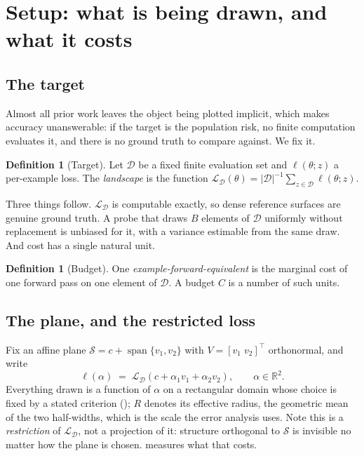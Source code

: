 \documentclass[11pt]{article}
\theoremstyle{definition}
\newtheorem{definition}[theorem]{Definition}
\newcommand{\R}{\mathbb{R}}
\newcommand{\Loss}{\mathcal{L}}
\newcommand{\D}{\mathcal{D}}
\newcommand{\Plane}{\mathcal{S}}
\begin{document}
\section{Setup: what is being drawn, and what it costs}
\label{sec:setup}

\subsection{The target}

Almost all prior work leaves the object being plotted implicit, which makes accuracy
unanswerable: if the target is the population risk, no finite computation evaluates it,
and there is no ground truth to compare against. We fix it.

\begin{definition}[Target]
Let $\D$ be a fixed finite evaluation set and $\ell(\theta;z)$ a per-example loss. The
\emph{landscape} is the function
$\Loss_\D(\theta)=|\D|^{-1}\sum_{z\in\D}\ell(\theta;z)$.
\end{definition}

Three things follow. $\Loss_\D$ is computable exactly, so dense reference surfaces are
genuine ground truth. A probe that draws $B$ elements of $\D$ uniformly without
replacement is unbiased for it, with a variance estimable from the same draw. And cost
has a single natural unit.

\begin{definition}[Budget]
One \emph{example-forward-equivalent} is the marginal cost of one forward pass on one
element of $\D$. A budget $C$ is a number of such units.
\end{definition}

\subsection{The plane, and the restricted loss}

Fix an affine plane $\Plane=c+\operatorname{span}\{v_1,v_2\}$ with $V=[v_1\;v_2]^\top$
orthonormal, and write
\[
  \ell(\alpha)\;=\;\Loss_\D(c+\alpha_1v_1+\alpha_2v_2),\qquad \alpha\in\R^2 .
\]
Everything drawn is a function of $\alpha$ on a rectangular domain whose choice is fixed
by a stated criterion (); $R$ denotes its effective radius, the
geometric mean of the two half-widths, which is the scale the error analysis uses. Note
this is a \emph{restriction} of $\Loss_\D$, not a projection of it: structure orthogonal
to $\Plane$ is invisible no matter how the plane is chosen.  measures
what that costs.
\end{document}
